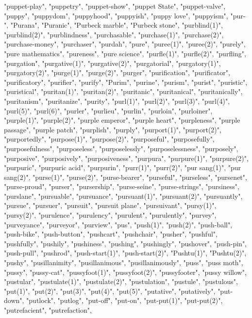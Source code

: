 "puppet-play",
"puppetry",
"puppet-show",
"puppet State",
"puppet-valve",
"puppy",
"puppydom",
"puppyhood",
"puppyish",
"puppy love",
"puppyism",
"pur-",
"Purana",
"Puranic",
"Purbeck marble",
"Purbeck stone",
"purblind(1)",
"purblind(2)",
"purblindness",
"purchasable",
"purchase(1)",
"purchase(2)",
"purchase-money",
"purchaser",
"purdah",
"pure",
"puree(1)",
"puree(2)",
"purely",
"pure mathematics",
"pureness",
"pure science",
"purfle(1)",
"purfle(2)",
"purfling",
"purgation",
"purgative(1)",
"purgative(2)",
"purgatorial",
"purgatory(1)",
"purgatory(2)",
"purge(1)",
"purge(2)",
"purger",
"purification",
"purificator",
"purificatory",
"purifier",
"purify",
"Purim",
"purine",
"purism",
"purist",
"puristic",
"puristical",
"puritan(1)",
"puritan(2)",
"puritanic",
"puritanical",
"puritanically",
"puritanism",
"puritanize",
"purity",
"purl(1)",
"purl(2)",
"purl(3)",
"purl(4)",
"purl(5)",
"purl(6)",
"purler",
"purlieu",
"purlin",
"purloin",
"purloiner",
"purple(1)",
"purple(2)",
"purple emperor",
"purple heart",
"purpleness",
"purple passage",
"purple patch",
"purplish",
"purply",
"purport(1)",
"purport(2)",
"purportedly",
"purpose(1)",
"purpose(2)",
"purposeful",
"purposefully",
"purposefulness",
"purposeless",
"purposelessly",
"purposelessness",
"purposely",
"purposive",
"purposively",
"purposiveness",
"purpura",
"purpure(1)",
"purpure(2)",
"purpuric",
"purpuric acid",
"purpurin",
"purr(1)",
"purr(2)",
"pur sang(1)",
"pur sang(2)",
"purse(1)",
"purse(2)",
"purse-bearer",
"purseful",
"purseless",
"pursenet",
"purse-proud",
"purser",
"pursership",
"purse-seine",
"purse-strings",
"pursiness",
"purslane",
"pursuable",
"pursuance",
"pursuant(1)",
"pursuant(2)",
"pursuantly",
"pursue",
"pursuer",
"pursuit",
"pursuit plane",
"pursuivant",
"pursy(1)",
"pursy(2)",
"purulence",
"purulency",
"purulent",
"purulently",
"purvey",
"purveyance",
"purveyor",
"purview",
"pus",
"push(1)",
"push(2)",
"push-ball",
"push-bike",
"push-button",
"pushcart",
"pushchair",
"pusher",
"pushful",
"pushfully",
"pushily",
"pushiness",
"pushing",
"pushingly",
"pushover",
"push-pin",
"push-pull",
"pushrod",
"push-start(1)",
"push-start(2)",
"Pushtu(1)",
"Pushtu(2)",
"pushy",
"pusillanimity",
"pusillanimous",
"pusillanimously",
"puss",
"puss moth",
"pussy",
"pussy-cat",
"pussyfoot(1)",
"pussyfoot(2)",
"pussyfooter",
"pussy willow",
"pustular",
"pustulate(1)",
"pustulate(2)",
"pustulation",
"pustule",
"pustulous",
"put(1)",
"put(2)",
"put(3)",
"put(4)",
"put(5)",
"putative",
"putatively",
"put-down",
"putlock",
"putlog",
"put-off",
"put-on",
"put-put(1)",
"put-put(2)",
"putrefacient",
"putrefaction",
